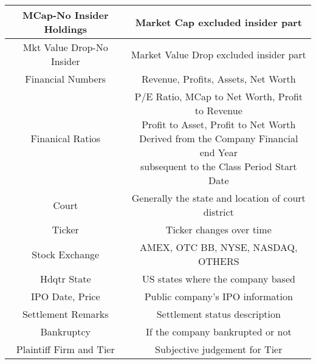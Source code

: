 \begin{table}[H]
\begin{center}
\begin{tabular}{ | c  | c |}
MCap-No Insider Holdings & Market Cap excluded insider part\\
\hline
\rowcolor{Gray}
Mkt Value Drop-No Insider & Market Value Drop excluded insider part\\
\hline
Financial Numbers & Revenue, Profits, Assets, Net Worth\\
\hline
\rowcolor{Gray}
Finanical Ratios & \makecell{P/E Ratio, MCap to Net Worth, Profit to Revenue\\ Profit to Asset, Profit to Net Worth\\Derived from the Company Financial end Year\\ subsequent to the Class Period Start Date}\\
\hline
Court & Generally the state and location of court district\\
\hline
\rowcolor{Gray}
Ticker & Ticker changes over time\\
\hline
Stock Exchange & AMEX, OTC BB, NYSE, NASDAQ, OTHERS\\
\hline
\rowcolor{Gray}
Hdqtr State & US states where the company based \\
\hline
IPO Date, Price & Public company's IPO information\\
\hline
\rowcolor{Gray}
Settlement Remarks & Settlement status description\\
\hline
Bankruptcy & If the company bankrupted or not\\
\hline
\rowcolor{Gray}
Plaintiff Firm and Tier & Subjective judgement for Tier\\
\hline
\end{tabular}
\end{center}
\end{table}


